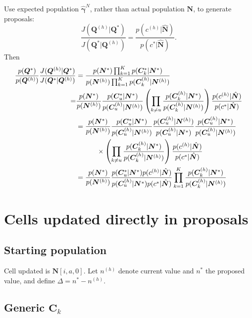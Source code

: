 \documentclass{article}
\begin{document}
Use expected population $\hat{\bm{\gamma}}^N$, rather than actual population $\bm{N}$, to generate proposals:
\begin{equation}
  \frac{ J(\bm{Q}^{(h)} | \bm{Q}^*) }{ J(\bm{Q}^* | \bm{Q}^{(h)}) } = \frac{ p(c^{(h)} | \hat{\bm{N}}) }{ p(c^* | \hat{\bm{N}})}.
\end{equation}
Then
\begin{align}
  \frac{ p(\bm{Q}^*) }{ p(\bm{Q}^{(h)}) } \frac{ J(\bm{Q}^{(h)} | \bm{Q}^*) }{ J(\bm{Q}^* | \bm{Q}^{(h)}) } & = \frac{ p(\bm{N}^*) \prod_{k=1}^K p(\bm{C}_k^* | \bm{N}^*) }{ p(\bm{N}^{(h)}) \prod_{k=1}^K p(\bm{C}_k^{(h)} | \bm{N}^{(h)}) } \\
  = & \frac{ p(\bm{N}^*) }{ p(\bm{N}^{(h)}) } \frac{ p(\bm{C}_u^* | \bm{N}^*) }{ p(\bm{C}_u^{(h)} | \bm{N}^{(h)}) } \left( \prod_{ k \neq u} \frac{ p(\bm{C}_k^{(h)} | \bm{N}^*) }{ p(\bm{C}_k^{(h)} | \bm{N}^{(h)}) } \right) \frac{ p(c^{(h)} | \hat{\bm{N}}) }{ p(c^* | \hat{\bm{N}})} \\
  & = \frac{ p(\bm{N}^*) }{ p(\bm{N}^{(h)}) } \frac{ p(\bm{C}_u^* | \bm{N}^*) }{ p(\bm{C}_u^{(h)} | \bm{N}^{(h)}) }  \frac{ p(\bm{C}_u^{(h)} | \bm{N}^{(h)}) }{ p(\bm{C}_u^{(h)} | \bm{N}^*) }  \frac{ p(\bm{C}_u^{(h)} | \bm{N}^*) }{ p(\bm{C}_u^{(h)} | \bm{N}^{(h)}) } \notag \\ 
 & \quad \quad \quad \times \left( \prod_{ k \neq u} \frac{ p(\bm{C}_k^{(h)} | \bm{N}^*) }{ p(\bm{C}_k^{(h)} | \bm{N}^{(h)}) } \right) \frac{ p(c^{(h)} | \hat{\bm{N}}) }{ p(c^* | \hat{\bm{N}})} \\
  & = \frac{ p(\bm{N}^*) }{ p(\bm{N}^{(h)}) }  \frac{ p(\bm{C}_u^* | \bm{N}^*) p(c^{(h)} | \hat{\bm{N}}) }{ p(\bm{C}_u^{(h)} | \bm{N}^*) p(c^* | \hat{\bm{N}}) } \prod_{k=1}^K \frac{ p(\bm{C}_k^{(h)} | \bm{N}^*) }{ p(\bm{C}_k^{(h)} | \bm{N}^{(h)}) } 
\end{align}


\section{Cells updated directly in proposals}

\subsection{Starting population}

Cell updated is $\bm{N}[i, a, 0]$.  Let $n^{(h)}$ denote current value and $n^*$ the proposed value, and define $\Delta = n^* - n^{(h)}$.

\subsection{Generic  $\bm{C}_k$}
\end{document}
